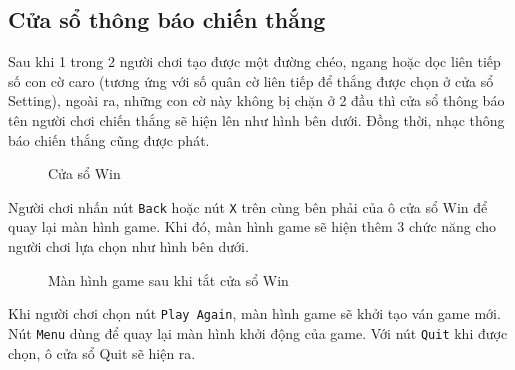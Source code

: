 \subsection{Cửa sổ thông báo chiến thắng}
Sau khi 1 trong 2 người chơi tạo được một đường chéo, ngang hoặc dọc liên tiếp số con cờ caro (tương ứng với số quân cờ liên tiếp để thắng được chọn ở cửa sổ Setting), ngoài ra, những con cờ này không bị chặn ở 2 đầu thì cửa sổ thông báo tên người chơi chiến thắng sẽ hiện lên như hình bên dưới. Đồng thời, nhạc thông báo chiến thắng cũng được phát.
\begin{figure}[H]
  \caption{Cửa sổ Win}
\end{figure}
Người chơi nhấn nút \verb|Back| hoặc nút \verb|X| trên cùng bên phải của ô cửa sổ Win để quay lại màn hình game. Khi đó, màn hình game sẽ hiện thêm 3 chức năng cho người chơi lựa chọn như hình bên dưới.
\begin{figure}[H]
  \caption{Màn hình game sau khi tắt cửa sổ Win}
\end{figure}
Khi người chơi chọn nút \verb|Play Again|, màn hình game sẽ khởi tạo ván game mới. Nút \verb|Menu| dùng để quay lại màn hình khởi động của game. Với nút \verb|Quit| khi được chọn, ô cửa sổ Quit sẽ hiện ra.
